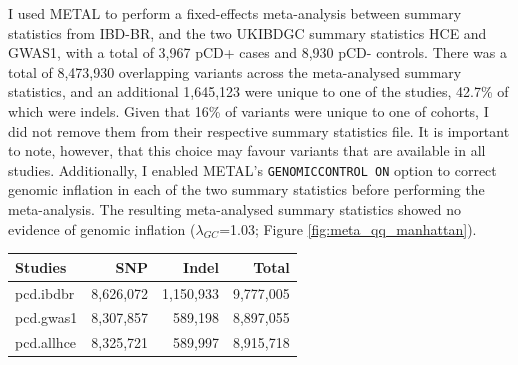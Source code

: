 I used METAL to perform a fixed-effects meta-analysis between summary statistics from IBD-BR, and the two UKIBDGC summary statistics HCE and GWAS1, with a total of 3,967 pCD+ cases and 8,930 pCD- controls. There was a total of 8,473,930 overlapping variants across the meta-analysed summary statistics, and an additional 1,645,123 were unique to one of the studies, 42.7\% of which were indels. Given that 16\% of variants were unique to one of cohorts, I did not remove them from their respective summary statistics file. It is important to note, however, that this choice may favour variants that are available in all studies. Additionally, I enabled METAL's \Verb+GENOMICCONTROL ON+ option to correct genomic inflation in each of the two summary statistics before performing the meta-analysis. The resulting meta-analysed summary statistics showed no evidence of genomic inflation ($\lambda_{GC}$=1.03; Figure \ref{fig:meta_qq_manhattan}). 
\begin{table}[H]
  \centering
  \begin{tabular}[t]{lrrr}
  \toprule
  \textbf{Studies} & \textbf{SNP} & \textbf{Indel} & \textbf{Total}\\
  \midrule
  pcd.ibdbr & 8,626,072 & 1,150,933 & 9,777,005\\
  pcd.gwas1 & 8,307,857 & 589,198 & 8,897,055\\
  pcd.allhce & 8,325,721 & 589,997 & 8,915,718\\
  \bottomrule
  \end{tabular}
  \end{table}
